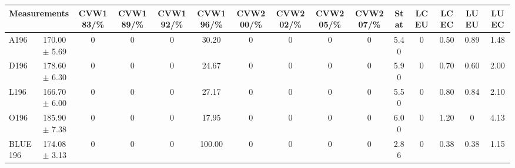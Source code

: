 \begin{table}[H]
\scriptsize
\begin{center}
\renewcommand{\arraystretch}{1.1}
\begin{tabular}{|lc|c|c|c|c|c|c|c|c|ccccc|}
\hline
\multicolumn{2}{|c|}{Measurements} & CVW{\tiny 183}/\%  & CVW{\tiny 189}/\%  & CVW{\tiny 192}/\%  & CVW{\tiny 196}/\%  & CVW{\tiny 200}/\%  & CVW{\tiny 202}/\%  & CVW{\tiny 205}/\%  & CVW{\tiny 207}/\%  & {\tiny Stat} & {\tiny LCEU} & {\tiny LCEC} & {\tiny LUEU} & {\tiny LUEC}\\
\hline
A196 &     170.00 $\pm$       5.69 &  0 &  0 &  0 &      30.20 &  0 &  0 &  0 &  0 &       5.40 &  0 &       0.50 &       0.89 &       1.48\\
D196 &     178.60 $\pm$       6.30 &  0 &  0 &  0 &      24.67 &  0 &  0 &  0 &  0 &       5.90 &  0 &       0.70 &       0.60 &       2.00\\
L196 &     166.70 $\pm$       6.00 &  0 &  0 &  0 &      27.17 &  0 &  0 &  0 &  0 &       5.50 &  0 &       0.80 &       0.84 &       2.10\\
O196 &     185.90 $\pm$       7.38 &  0 &  0 &  0 &      17.95 &  0 &  0 &  0 &  0 &       6.00 &  0 &       1.20 &  0 &       4.13\\
\hline
BLUE {\tiny 196} &     174.08 $\pm$       3.13 &  0 &  0 &  0 &     100.00 &  0 &  0 &  0 &  0 &       2.86 &  0 &       0.38 &       0.38 &       1.15\\
\hline
\end{tabular}
\renewcommand{\arraystretch}{1}
\end{center}
\end{table}
\vspace*{-0.5cm}
